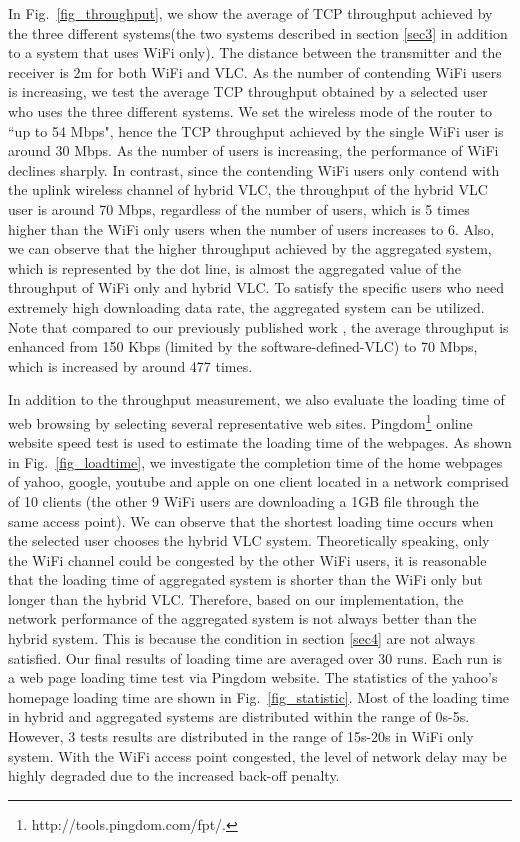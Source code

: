 \documentclass[10pt,journal]{IEEEtran}
\begin{document}
In Fig.~\ref{fig_throughput}, we show the average of TCP throughput achieved by the three different systems(the two systems described in section \ref{sec3} in addition to a system that uses WiFi only). The distance between the transmitter and the receiver is 2m for both WiFi and VLC. As the number of contending WiFi users is increasing, we test the average TCP throughput obtained by a selected user who uses the three different systems. We set the wireless mode of the router to ``up to 54 Mbps", hence the TCP throughput achieved by the single WiFi user is around 30 Mbps. As the number of users is increasing, the performance of WiFi declines sharply. In contrast, since the contending WiFi users only contend with the uplink wireless channel of hybrid VLC, the throughput of the hybrid VLC user is around 70 Mbps, regardless of the number of users, which is 5 times higher than the WiFi only users when the number of users increases to 6. Also, we can observe that the higher throughput achieved by the aggregated system, which is represented by the dot line, is almost the aggregated value of the throughput of WiFi only and hybrid VLC. To satisfy the specific users who need extremely high downloading data rate, the aggregated system can be utilized. Note that compared to our previously published work \cite{shaoindoor}, the average throughput is enhanced from 150 Kbps (limited by the software-defined-VLC) to 70 Mbps, which is increased by around 477 times.

In addition to the throughput measurement, we also evaluate the loading time of web browsing by selecting several representative web sites. Pingdom\footnote{http://tools.pingdom.com/fpt/.} online website speed test is used to estimate the loading time of the webpages. As shown in Fig.~\ref{fig_loadtime}, we investigate the completion time of the home webpages of yahoo, google, youtube and apple on one client located in a network comprised of 10 clients (the other 9 WiFi users are downloading a 1GB file through the same access point). We can observe that the shortest loading time occurs when the selected user chooses the hybrid VLC system. Theoretically speaking, only the WiFi channel could be congested by the other WiFi users, it is reasonable that the loading time of aggregated system is shorter than the WiFi only but longer than the hybrid VLC. Therefore, based on our implementation, the network performance of the aggregated system is not always better than the hybrid system. This is because the condition in section \ref{sec4} are not always satisfied. Our final results of loading time are averaged over 30 runs. Each run is a web page loading time test via Pingdom website. The statistics of the yahoo's homepage loading time are shown in Fig.~\ref{fig_statistic}. Most of the loading time in hybrid and aggregated systems are distributed within the range of 0s-5s. However, 3 tests results are distributed in the range of 15s-20s in WiFi only system. With the WiFi access point congested, the level of network delay may be highly degraded due to the increased back-off penalty.
\end{document}
